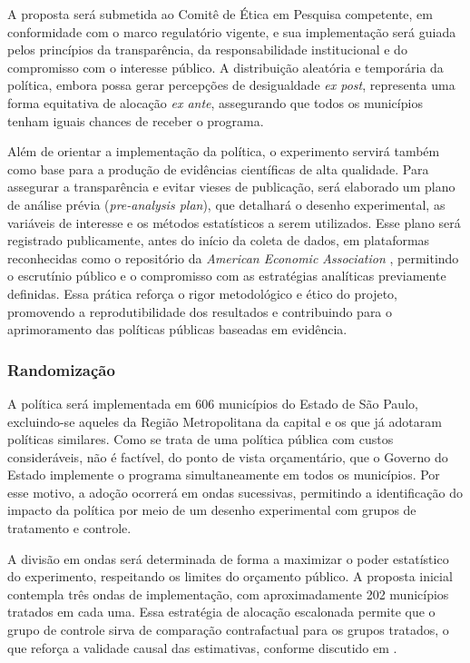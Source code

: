 A proposta será submetida ao Comitê de Ética em Pesquisa competente, em conformidade com o marco regulatório vigente, e sua implementação será guiada pelos princípios da transparência, da responsabilidade institucional e do compromisso com o interesse público. A distribuição aleatória e temporária da política, embora possa gerar percepções de desigualdade \textit{ex post}, representa uma forma equitativa de alocação \textit{ex ante}, assegurando que todos os municípios tenham iguais chances de receber o programa.


Além de orientar a implementação da política, o experimento servirá também como base para a produção de evidências científicas de alta qualidade. Para assegurar a transparência e evitar vieses de publicação, será elaborado um plano de análise prévia (\textit{pre-analysis plan}), que detalhará o desenho experimental, as variáveis de interesse e os métodos estatísticos a serem utilizados. Esse plano será registrado publicamente, antes do início da coleta de dados, em plataformas reconhecidas como o repositório da\textit{ American Economic Association} \cite{AEA_registry}, permitindo o escrutínio público e o compromisso com as estratégias analíticas previamente definidas. Essa prática reforça o rigor metodológico e ético do projeto, promovendo a reprodutibilidade dos resultados e contribuindo para o aprimoramento das políticas públicas baseadas em evidência.

\subsubsection{Randomização}

A política será implementada em 606 municípios do Estado de São Paulo, excluindo-se aqueles da Região Metropolitana da capital e os que já adotaram políticas similares. Como se trata de uma política pública com custos consideráveis, não é factível, do ponto de vista orçamentário, que o Governo do Estado implemente o programa simultaneamente em todos os municípios. Por esse motivo, a adoção ocorrerá em ondas sucessivas, permitindo a identificação do impacto da política por meio de um desenho experimental com grupos de tratamento e controle.

A divisão em ondas será determinada de forma a maximizar o poder estatístico do experimento, respeitando os limites do orçamento público. A proposta inicial contempla três ondas de implementação, com aproximadamente 202 municípios tratados em cada uma. Essa estratégia de alocação escalonada permite que o grupo de controle sirva de comparação contrafactual para os grupos tratados, o que reforça a validade causal das estimativas, conforme discutido em \cite{duflo2008toolkit}.

